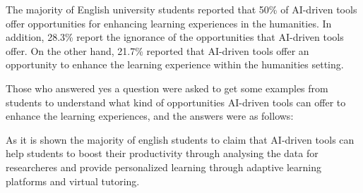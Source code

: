 \begin{figure}[h]
	\centering
\end{figure}
The majority of English university students reported that 50\% of AI-driven tools offer opportunities for enhancing learning experiences in the humanities.
In addition, 28.3\% report the ignorance of the opportunities that AI-driven tools offer.
On the other hand, 21.7\% reported that AI-driven tools offer an opportunity to enhance the learning experience within the humanities setting.

Those who answered yes a question were asked to get some examples from students
to understand what kind of opportunities AI-driven tools can offer to enhance the learning experiences,
and the answers were as follows:


As it is shown the majority of english students to claim that AI-driven tools can
help students to boost their productivity through analysing the data for researcheres
and provide personalized learning through adaptive learning platforms and virtual tutoring.

